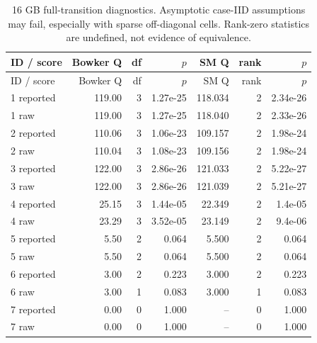 {\small\setlength{\tabcolsep}{3pt}\begin{longtable}{lrrrrrr}
\caption{16 GB full-transition diagnostics. Asymptotic case-IID assumptions may fail, especially with sparse off-diagonal cells. Rank-zero statistics are undefined, not evidence of equivalence.}\\
ID / score & Bowker Q & df & $p$ & SM Q & rank & $p$\\\toprule\endfirsthead
ID / score & Bowker Q & df & $p$ & SM Q & rank & $p$\\\toprule\endhead
1 reported & 119.00 & 3 & 1.27e-25 & 118.034 & 2 & 2.34e-26\\
1 raw & 119.00 & 3 & 1.27e-25 & 118.040 & 2 & 2.33e-26\\
2 reported & 110.06 & 3 & 1.06e-23 & 109.157 & 2 & 1.98e-24\\
2 raw & 110.04 & 3 & 1.08e-23 & 109.156 & 2 & 1.98e-24\\
3 reported & 122.00 & 3 & 2.86e-26 & 121.033 & 2 & 5.22e-27\\
3 raw & 122.00 & 3 & 2.86e-26 & 121.039 & 2 & 5.21e-27\\
4 reported & 25.15 & 3 & 1.44e-05 & 22.349 & 2 & 1.4e-05\\
4 raw & 23.29 & 3 & 3.52e-05 & 23.149 & 2 & 9.4e-06\\
5 reported & 5.50 & 2 & 0.064 & 5.500 & 2 & 0.064\\
5 raw & 5.50 & 2 & 0.064 & 5.500 & 2 & 0.064\\
6 reported & 3.00 & 2 & 0.223 & 3.000 & 2 & 0.223\\
6 raw & 3.00 & 1 & 0.083 & 3.000 & 1 & 0.083\\
7 reported & 0.00 & 0 & 1.000 & -- & 0 & 1.000\\
7 raw & 0.00 & 0 & 1.000 & -- & 0 & 1.000\\
\bottomrule\end{longtable}}